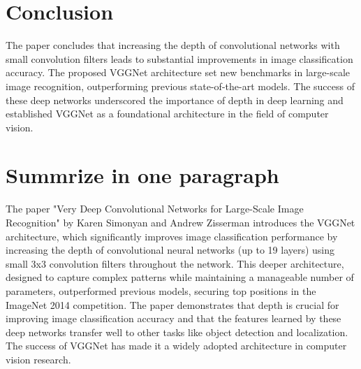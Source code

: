 \documentclass{report}
\begin{document}
	\section{Conclusion}
	The paper concludes that increasing the depth of convolutional networks with small convolution filters leads to substantial improvements in image classification accuracy. The proposed VGGNet architecture set new benchmarks in large-scale image recognition, outperforming previous state-of-the-art models. The success of these deep networks underscored the importance of depth in deep learning and established VGGNet as a foundational architecture in the field of computer vision.
	
	\section{Summrize in one paragraph}
	The paper "Very Deep Convolutional Networks for Large-Scale Image Recognition" by Karen Simonyan and Andrew Zisserman introduces the VGGNet architecture, which significantly improves image classification performance by increasing the depth of convolutional neural networks (up to 19 layers) using small 3x3 convolution filters throughout the network. This deeper architecture, designed to capture complex patterns while maintaining a manageable number of parameters, outperformed previous models, securing top positions in the ImageNet 2014 competition. The paper demonstrates that depth is crucial for improving image classification accuracy and that the features learned by these deep networks transfer well to other tasks like object detection and localization. The success of VGGNet has made it a widely adopted architecture in computer vision research.
	
	
	\newpage
	
	
	
\end{document}
